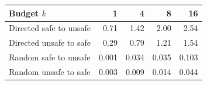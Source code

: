 \begin{tabular}{@{}lrrrr@{}}
\toprule
Budget $k$ & 1 & 4 & 8 & 16\\
\midrule
Directed safe to unsafe & 0.71 & 1.42 & 2.00 & 2.54\\
Directed unsafe to safe & 0.29 & 0.79 & 1.21 & 1.54\\
Random safe to unsafe & 0.001 & 0.034 & 0.035 & 0.103\\
Random unsafe to safe & 0.003 & 0.009 & 0.014 & 0.044\\
\bottomrule
\end{tabular}
